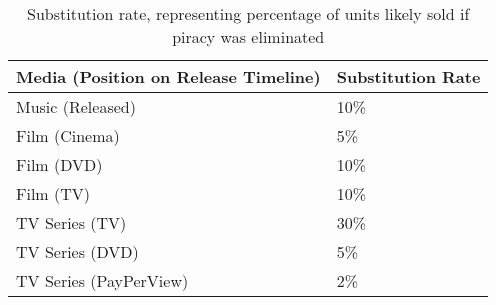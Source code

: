 \begin{table}[h]
\centering
\begin{tabular}{ll}
Media (Position on Release Timeline)            & Substitution Rate \\
\hline
Music (Released) & 10\%   \\
Film (Cinema)   & 5\% \\
Film (DVD)      & 10\% \\
Film (TV)      & 10\% \\
TV Series (TV)  & 30\% \\
TV Series (DVD) & 5\% \\
TV Series (PayPerView) & 2\%
\end{tabular}
\caption{Substitution rate, representing percentage of units likely sold if piracy was eliminated \citep[p.19, Table 6]{tera2010}}
\label{table:substitution}
\end{table}


